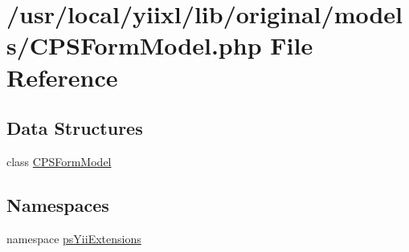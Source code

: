 \hypertarget{CPSFormModel_8php}{
\section{/usr/local/yiixl/lib/original/models/CPSFormModel.php File Reference}
\label{CPSFormModel_8php}
}
\subsection*{Data Structures}
\begin{DoxyCompactItemize}
\item 
class \hyperlink{classCPSFormModel}{CPSFormModel}
\end{DoxyCompactItemize}
\subsection*{Namespaces}
\begin{DoxyCompactItemize}
\item 
namespace \hyperlink{namespacepsYiiExtensions}{psYiiExtensions}
\end{DoxyCompactItemize}
